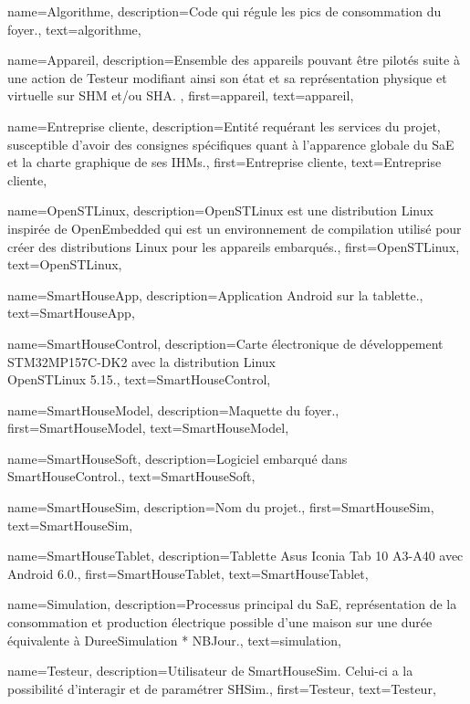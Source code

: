 {
    name={Algorithme},
    description={Code qui régule les pics de consommation du foyer.},
    text={algorithme},
}

{
    name={Appareil},
    description={Ensemble des appareils pouvant être pilotés suite à une action de \gls{Testeur} modifiant ainsi son état et sa représentation physique et virtuelle sur \gls{SHM} et/ou \gls{SHA}. },
    first={appareil},
    text={appareil},
}

{
    name={Entreprise cliente},
    description={Entité requérant les services du projet, susceptible d'avoir des consignes
    spécifiques quant à l'apparence globale du SaE et la charte graphique de ses IHMs.},
    first={Entreprise cliente},
    text={Entreprise cliente},
}

{
    name={OpenSTLinux},
    description={OpenSTLinux est une distribution Linux inspirée de OpenEmbedded qui est un environnement de compilation utilisé pour créer des distributions Linux pour les appareils embarqués.},
    first={OpenSTLinux},
    text={OpenSTLinux},
}

{
    name={SmartHouseApp},
    description={Application Android sur la tablette.},
    text={SmartHouseApp},
}

{
    name={SmartHouseControl},
    description={Carte électronique de développement STM32MP157C-DK2 avec la distribution Linux \\OpenSTLinux 5.15.},
    text={SmartHouseControl},
}

{
    name={SmartHouseModel},
    description={Maquette du foyer.},
    first={SmartHouseModel},
    text={SmartHouseModel},
}

{
    name={SmartHouseSoft},
    description={Logiciel embarqué dans SmartHouseControl.},
    text={SmartHouseSoft},
}

{
    name={SmartHouseSim},
    description={Nom du projet.},
    first={SmartHouseSim},
    text={SmartHouseSim},
}

{
    name={SmartHouseTablet},
    description={Tablette Asus Iconia Tab 10 A3-A40 avec Android 6.0.},
    first={SmartHouseTablet},
    text={SmartHouseTablet},
}

{
    name={Simulation},
    description={Processus principal du SaE, représentation de la consommation et production électrique possible d'une maison sur une durée équivalente à DureeSimulation * NBJour.},
    text={simulation},
}

{
    name={Testeur},
    description={Utilisateur de SmartHouseSim. Celui-ci a la possibilité d'interagir et de paramétrer \gls{SHSim}.},
    first={Testeur},
    text={Testeur},
}
